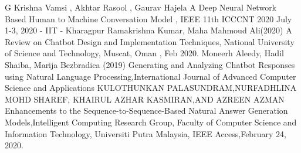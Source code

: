 \documentclass[12pt,a4paper]{report}     %
\begin{document}
\newpage
{}

\begin{normalsize}
				{\setlength{\baselineskip}{1.1\baselineskip}
{
\begin{thebibliography}{9}

 G Krishna Vamsi , Akhtar Rasool , Gaurav Hajela A Deep Neural Network Based Human to Machine Conversation Model , IEEE 11th ICCCNT 2020
July 1-3, 2020 - IIT - Kharagpur 
Ramakrishna Kumar, Maha Mahmoud Ali(2020) A Review on Chatbot Design and Implementation Techniques, National University of Science and Technology, Muscat, Oman , Feb 2020.
 Moneerh Aleedy, Hadil Shaiba, Marija Bezbradica (2019) Generating and Analyzing Chatbot Responses using Natural Language Processing,International Journal of Advanced Computer Science and Applications
 KULOTHUNKAN PALASUNDRAM,NURFADHLINA MOHD SHAREF, KHAIRUL AZHAR KASMIRAN,AND AZREEN AZMAN Enhancements to the Sequence-to-Sequence-Based Natural Answer Generation Models,Intelligent Computing Research Group, Faculty of Computer Science and Information Technology, Universiti Putra Malaysia, IEEE Access,February 24, 2020.



\end{thebibliography}
\par}
}

\newpage					%

\appendix
{}



     
   
\end{normalsize}
\end{document}
